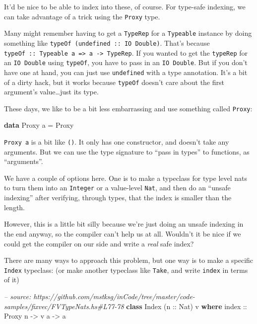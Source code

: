 \documentclass[]{article}
\newenvironment{Shaded}{}{}
\newcommand{\KeywordTok}[1]{\textcolor[rgb]{0.00,0.44,0.13}{\textbf{{#1}}}}
\newcommand{\DataTypeTok}[1]{\textcolor[rgb]{0.56,0.13,0.00}{{#1}}}
\newcommand{\CommentTok}[1]{\textcolor[rgb]{0.38,0.63,0.69}{\textit{{#1}}}}
\newcommand{\OtherTok}[1]{\textcolor[rgb]{0.00,0.44,0.13}{{#1}}}
\newcommand{\FunctionTok}[1]{\textcolor[rgb]{0.02,0.16,0.49}{{#1}}}
\newcommand{\NormalTok}[1]{{#1}}
\begin{document}
It'd be nice to be able to index into these, of course. For type-safe indexing,
we can take advantage of a trick using the \texttt{Proxy} type.

Many might remember having to get a \texttt{TypeRep} for a \texttt{Typeable}
instance by doing something like \texttt{typeOf\ (undefined\ ::\ IO\ Double)}.
That's because
\texttt{typeOf\ ::\ Typeable\ a\ =\textgreater{}\ a\ -\textgreater{}\ TypeRep}.
If you wanted to get the \texttt{typeRep} for an \texttt{IO\ Double} using
\texttt{typeOf}, you have to pass in an \texttt{IO\ Double}. But if you don't
have one at hand, you can just use \texttt{undefined} with a type annotation.
It's a bit of a dirty hack, but it works because \texttt{typeOf} doesn't care
about the first argument's value\ldots{}just its type.

These days, we like to be a bit less embarrassing and use something called
\texttt{Proxy}:

\begin{Shaded}
\begin{Highlighting}[]
\KeywordTok{data} \DataTypeTok{Proxy} \NormalTok{a }\FunctionTok{=} \DataTypeTok{Proxy}
\end{Highlighting}
\end{Shaded}

\texttt{Proxy\ a} is a bit like \texttt{()}. It only has one constructor, and
doesn't take any arguments. But we can use the type signature to ``pass in
types'' to functions, as ``arguments''.

We have a couple of options here. One is to make a typeclass for type level nats
to turn them into an \texttt{Integer} or a value-level \texttt{Nat}, and then do
an ``unsafe indexing'' after verifying, through types, that the index is smaller
than the length.

However, this is a little bit silly because we're just doing an unsafe indexing
in the end anyway, so the compiler can't help us at all. Wouldn't it be nice if
we could get the compiler on our side and write a \emph{real} safe index?

There are many ways to approach this problem, but one way is to make a specific
\texttt{Index} typeclass: (or make another typeclass like \texttt{Take}, and
write \texttt{index} in terms of it)

\begin{Shaded}
\begin{Highlighting}[]
\CommentTok{-- source: https://github.com/mstksg/inCode/tree/master/code-samples/fixvec/FVTypeNats.hs#L77-78}
\KeywordTok{class} \DataTypeTok{Index} \NormalTok{(}\OtherTok{n ::} \DataTypeTok{Nat}\NormalTok{) v }\KeywordTok{where}
\OtherTok{    index ::} \DataTypeTok{Proxy} \NormalTok{n }\OtherTok{->} \NormalTok{v a }\OtherTok{->} \NormalTok{a}
\end{Highlighting}
\end{Shaded}
\end{document}
